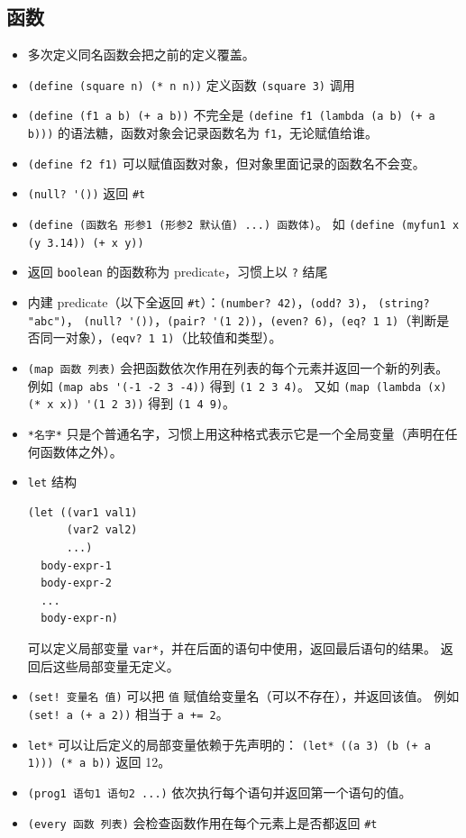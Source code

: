 \subsection{函数}
\begin{itemize}
\item 多次定义同名函数会把之前的定义覆盖。
\item \verb`(define (square n) (* n n))` 定义函数 \verb`(square 3)` 调用
\item \verb`(define (f1 a b) (+ a b))` 不完全是 \verb`(define f1 (lambda (a b) (+ a b)))` 的语法糖，函数对象会记录函数名为 \verb`f1`，无论赋值给谁。
\item \verb`(define f2 f1)` 可以赋值函数对象，但对象里面记录的函数名不会变。
\item \verb`(null? '())` 返回 \verb`#t`
\item \verb`(define (函数名 形参1 (形参2 默认值) ...) 函数体)`。 如 \verb`(define (myfun1 x (y 3.14)) (+ x y))`
\item 返回 \verb`boolean` 的函数称为 predicate，习惯上以 \verb`?` 结尾
\item 内建 predicate（以下全返回 \verb`#t`）：\verb`(number? 42)`，\verb`(odd? 3)`， \verb`(string? "abc")`， \verb`(null? '())`，\verb`(pair? '(1 2))`，\verb`(even? 6)`，\verb`(eq? 1 1)`（判断是否同一对象），\verb`(eqv? 1 1)`（比较值和类型）。
\item \verb`(map 函数 列表)` 会把函数依次作用在列表的每个元素并返回一个新的列表。 例如 \verb`(map abs '(-1 -2 3 -4))` 得到 \verb`(1 2 3 4)`。 又如 \verb`(map (lambda (x) (* x x)) '(1 2 3))` 得到 \verb`(1 4 9)`。
\item \verb`*名字*` 只是个普通名字，习惯上用这种格式表示它是一个全局变量（声明在任何函数体之外）。
\item \verb`let` 结构
\begin{lstlisting}[language=none]
(let ((var1 val1)
      (var2 val2)
      ...)
  body-expr-1
  body-expr-2
  ...
  body-expr-n)
\end{lstlisting}
可以定义局部变量 \verb`var*`，并在后面的语句中使用，返回最后语句的结果。 返回后这些局部变量无定义。
\item \verb`(set! 变量名 值)` 可以把 \verb`值` 赋值给变量名（可以不存在），并返回该值。 例如 \verb`(set! a (+ a 2))` 相当于 \verb`a += 2`。
\item \verb`let*` 可以让后定义的局部变量依赖于先声明的： \verb`(let* ((a 3) (b (+ a 1))) (* a b))` 返回 12。
\item \verb`(prog1 语句1 语句2 ...)` 依次执行每个语句并返回第一个语句的值。
\item \verb`(every 函数 列表)` 会检查函数作用在每个元素上是否都返回 \verb`#t`

\end{itemize}
